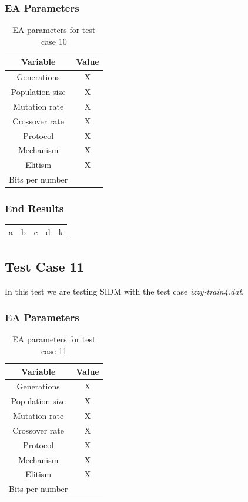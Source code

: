\subsubsection{EA Parameters}\label{sec:test-case-10-parameters}
\begin{table}
	\begin{tabular}{c c}
		Variable & Value \\
		\hline
		Generations & X \\
		\hline
		Population size & X \\
		\hline
		Mutation rate & X \\
		\hline
		Crossover rate & X \\
		\hline
		Protocol & X \\
		\hline
		Mechanism & X \\
		\hline
		Elitism & X \\
		\hline
		Bits per number & \\
	\end{tabular}
	\caption{EA parameters for test case 10}
\end{table}
\subsubsection{End Results}\label{sec:test-case-10-results}
\begin{table}
	\begin{tabular}{c c c c c}
		a & b & c & d & k \\
	\end{tabular}
\end{table}

\subsection{Test Case 11}\label{sec:test-case-11}
In this test we are testing SIDM with the test case
\textit{izzy-train4.dat}.
\subsubsection{EA Parameters}\label{sec:test-case-11-parameters}
\begin{table}
	\begin{tabular}{c c}
		Variable & Value \\
		\hline
		Generations & X \\
		\hline
		Population size & X \\
		\hline
		Mutation rate & X \\
		\hline
		Crossover rate & X \\
		\hline
		Protocol & X \\
		\hline
		Mechanism & X \\
		\hline
		Elitism & X \\
		\hline
		Bits per number & \\
	\end{tabular}
	\caption{EA parameters for test case 11}
\end{table}

